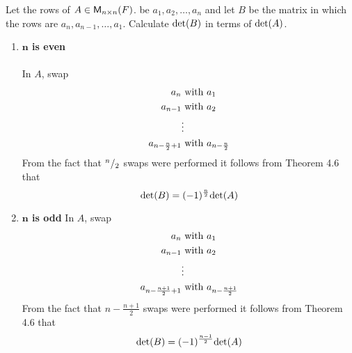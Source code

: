 Let the rows of $A \in \mathsf{M}_{n \times n}(F)$. be $a_1,a_2,\dotsc,a_n$ and let
$B$ be the matrix in which the rows are
$a_n,a_{n-1},\dotsc,a_1$. Calculate $\text{det}({B})$ in terms of $\text{det}({A})$.
\begin{enumerate}
\item {\bf $\mathbf{n}$ is even}
\paragraph{}In $A$, swap
\begin{align}
a_{n} &\text{ with } a_1\\
 a_{n-1} &\text{ with } a_2\\
\notag&\vdots\\
 a_{n-\frac{n}{2}+1} &\text{ with } a_{n-\frac{n}{2}}
\end{align}
From the fact that $^{n}/_{2}$ swaps were performed it follows from
Theorem 4.6 that
\begin{equation}
\text{det}({B}) = (-1)^\frac{n}{2} \text{det}({A}) 
\end{equation}
\item {\bf $\mathbf{n}$ is odd}
In $A$, swap 
\begin{align}
a_{n} &\text{ with } a_1\\
 a_{n-1} &\text{ with } a_2\\
\notag&\vdots\\
 a_{n-\frac{n+1}{2}+1} &\text{ with } a_{n-\frac{n+1}{2}}
\end{align}
From the fact that $n-\frac{n+1}{2}$ swaps were performed it follows
from Theorem 4.6 that
\begin{equation}
\text{det}({B}) = (-1)^{\frac{n-1}{2}}\text{det}({A})
\end{equation}
\end{enumerate}

